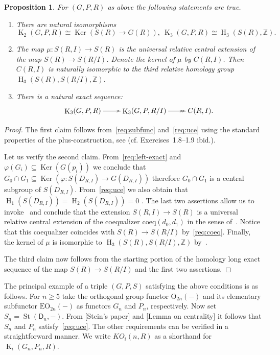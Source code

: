 \documentclass[oneside, 8pt]{amsart}
\newtheorem{prop}{Proposition}
\theoremstyle{remark}
\theoremstyle{definition}
\DeclareMathOperator{\Ker}{Ker}
\DeclareMathOperator{\St}{St}
\DeclareMathOperator{\HH}{H}
\DeclareMathOperator{\K}{K}
\newcommand{\ZZ}{\mathbb{Z}}
\newcommand{\rD}{\mathsf{D}}
\numberwithin{equation}{section}
\begin{document}
\begin{prop}\label{characterization}
For $(G, P, R)$ as above the following statements are true.
\begin{enumerate}
 \item There are natural isomorphisms
  \[ \K_2(G, P, R) \cong \Ker(S(R) \to G(R)), \ \K_3(G, P, R) \cong \HH_3(S(R), \ZZ). \]
 \item The map $\mu \colon S(R, I) \to S(R)$ is the universal relative central extension of the map $S(R) \to S(R/I)$.
       Denote the kernel of $\mu$ by $C(R, I)$.
       Then $C(R, I)$ is naturally isomorphic to the third relative homology group $\HH_3(S(R), S(R/I), \ZZ)$.
 \item There is a natural exact sequence:
 \[ \xymatrix{\K_3(G, P, R) \ar[r] & \K_3(G, P, R/I) \ar@{->>}[r] & C(R, I).} \]
 \end{enumerate}   
\end{prop}
\begin{proof}
 The first claim follows from~\ref{req:subfunc} and~\ref{req:uce} using the standard properties of the plus-construction, see \cite[\S~IV.1]{Kbook}   (cf. Exercises~1.8--1.9 ibid.). %
 
 Let us verify the second claim. From~\ref{req:left-exact} and $\varphi(G_i) \subseteq \Ker(G(p_i))$ we conclude that $G_0 \cap G_1 \subseteq \Ker(\varphi \colon S(D_{R, I}) \to G(D_{R, I}))$
  therefore $G_0 \cap G_1$ is a central subgroup of $S(D_{R, I})$.
 From~\ref{req:uce} we also obtain that $\HH_1(S(D_{R,I})) = \HH_2(S(D_{R,I})) = 0$ .
 The last two assertions allow us to invoke~\cite[Proposition~6]{Lo78} and conclude that the extension $S(R, I) \to S(R)$ is a universal relative central extension of the coequalizer $\mathrm{coeq}(d_0, d_1)$
  in the sense of~\cite[\S~3]{Lo78}. 
 Notice that this coequalizer coincides with $S(R) \to S(R/I)$ by~\ref{req:coeq}. 
 Finally, the kernel of $\mu$ is isomorphic to $\HH_3(S(R), S(R/I), \ZZ)$ by~\cite[Th{\'e}or{\`e}me~2]{Lo78}.
 
 The third claim now follows from the starting portion of the homology long exact sequence of the map $S(R) \to S(R/I)$ and the first two assertions.
\end{proof}

The principal example of a triple $(G,P,S)$ satisfying the above conditions is as follows.
For $n \geq 5$ take the orthogonal group functor $\mathrm{O}_{2n}(-)$ and its elementary subfunctor $\mathrm{EO}_{2n}(-)$ as functors $G_n$ and $P_n$, respectively. Now set $S_n = \St(\rD_n, -)$. From [Stein's paper] and [Lemma on centrality] it follows that $S_n$ and $P_n$ satisfy~\ref{req:uce}.
 The other requirements can be verified in a straightforward manner. We write $KO_i(n, R)$ as a shorthand for $\K_i(G_n, P_n, R)$.
\end{document}
